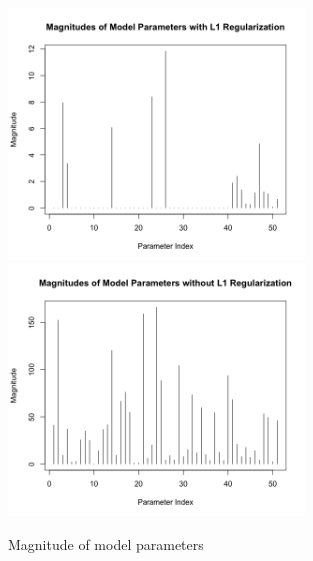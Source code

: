 \documentclass[12pt]{article}
\begin{document}
\begin{figure}[p]
\centering
\includegraphics[width=0.7\textwidth]{question_e_plot_A.png}
\includegraphics[width=0.7\textwidth]{question_e_plot_B.png}
\caption{Magnitude of model parameters}
\label{fig:fig2}
\end{figure}
\end{document}

